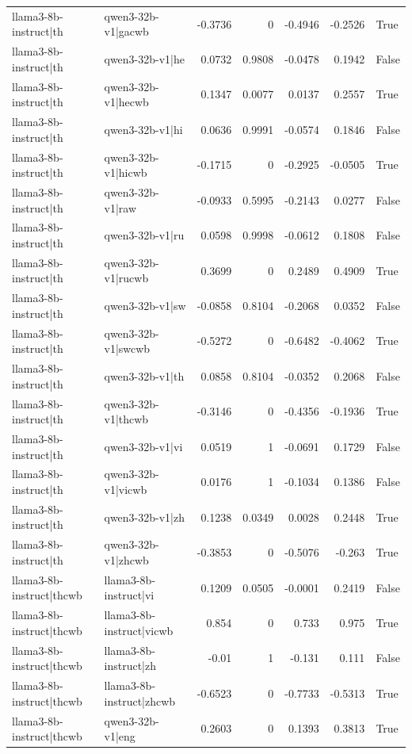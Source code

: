 \begin{table}
\begin{tabular}{l l r r r r l}
llama3-8b-instruct|th & qwen3-32b-v1|gacwb & -0.3736 & 0 & -0.4946 & -0.2526 & True \\
llama3-8b-instruct|th & qwen3-32b-v1|he & 0.0732 & 0.9808 & -0.0478 & 0.1942 & False \\
llama3-8b-instruct|th & qwen3-32b-v1|hecwb & 0.1347 & 0.0077 & 0.0137 & 0.2557 & True \\
llama3-8b-instruct|th & qwen3-32b-v1|hi & 0.0636 & 0.9991 & -0.0574 & 0.1846 & False \\
llama3-8b-instruct|th & qwen3-32b-v1|hicwb & -0.1715 & 0 & -0.2925 & -0.0505 & True \\
llama3-8b-instruct|th & qwen3-32b-v1|raw & -0.0933 & 0.5995 & -0.2143 & 0.0277 & False \\
llama3-8b-instruct|th & qwen3-32b-v1|ru & 0.0598 & 0.9998 & -0.0612 & 0.1808 & False \\
llama3-8b-instruct|th & qwen3-32b-v1|rucwb & 0.3699 & 0 & 0.2489 & 0.4909 & True \\
llama3-8b-instruct|th & qwen3-32b-v1|sw & -0.0858 & 0.8104 & -0.2068 & 0.0352 & False \\
llama3-8b-instruct|th & qwen3-32b-v1|swcwb & -0.5272 & 0 & -0.6482 & -0.4062 & True \\
llama3-8b-instruct|th & qwen3-32b-v1|th & 0.0858 & 0.8104 & -0.0352 & 0.2068 & False \\
llama3-8b-instruct|th & qwen3-32b-v1|thcwb & -0.3146 & 0 & -0.4356 & -0.1936 & True \\
llama3-8b-instruct|th & qwen3-32b-v1|vi & 0.0519 & 1 & -0.0691 & 0.1729 & False \\
llama3-8b-instruct|th & qwen3-32b-v1|vicwb & 0.0176 & 1 & -0.1034 & 0.1386 & False \\
llama3-8b-instruct|th & qwen3-32b-v1|zh & 0.1238 & 0.0349 & 0.0028 & 0.2448 & True \\
llama3-8b-instruct|th & qwen3-32b-v1|zhcwb & -0.3853 & 0 & -0.5076 & -0.263 & True \\
llama3-8b-instruct|thcwb & llama3-8b-instruct|vi & 0.1209 & 0.0505 & -0.0001 & 0.2419 & False \\
llama3-8b-instruct|thcwb & llama3-8b-instruct|vicwb & 0.854 & 0 & 0.733 & 0.975 & True \\
llama3-8b-instruct|thcwb & llama3-8b-instruct|zh & -0.01 & 1 & -0.131 & 0.111 & False \\
llama3-8b-instruct|thcwb & llama3-8b-instruct|zhcwb & -0.6523 & 0 & -0.7733 & -0.5313 & True \\
llama3-8b-instruct|thcwb & qwen3-32b-v1|eng & 0.2603 & 0 & 0.1393 & 0.3813 & True \\

\end{tabular}
\end{table}
